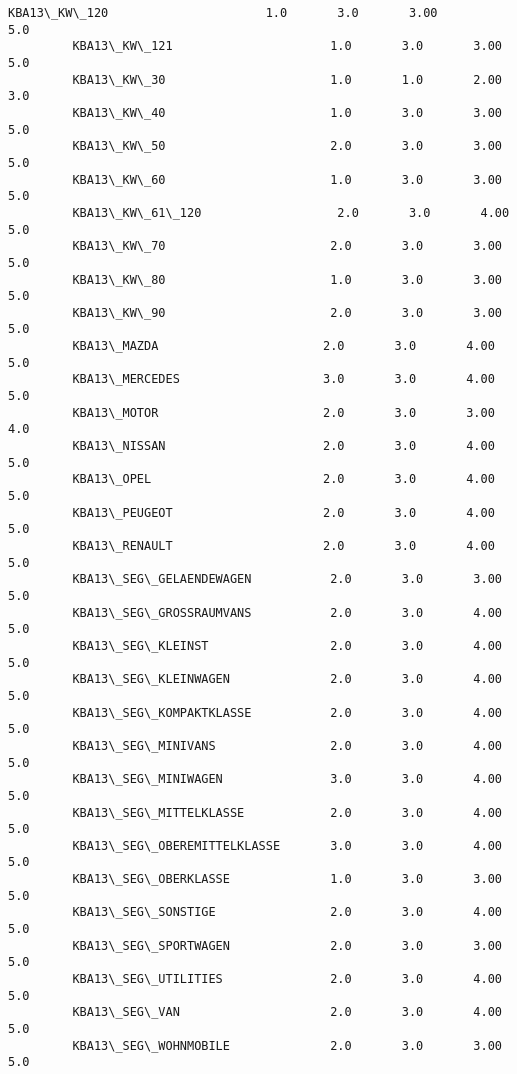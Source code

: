 \documentclass[11pt]{article}
\begin{document}
\begin{Verbatim}[commandchars=\\\{\}]
         KBA13\_KW\_120                      1.0       3.0       3.00        5.0  
         KBA13\_KW\_121                      1.0       3.0       3.00        5.0  
         KBA13\_KW\_30                       1.0       1.0       2.00        3.0  
         KBA13\_KW\_40                       1.0       3.0       3.00        5.0  
         KBA13\_KW\_50                       2.0       3.0       3.00        5.0  
         KBA13\_KW\_60                       1.0       3.0       3.00        5.0  
         KBA13\_KW\_61\_120                   2.0       3.0       4.00        5.0  
         KBA13\_KW\_70                       2.0       3.0       3.00        5.0  
         KBA13\_KW\_80                       1.0       3.0       3.00        5.0  
         KBA13\_KW\_90                       2.0       3.0       3.00        5.0  
         KBA13\_MAZDA                       2.0       3.0       4.00        5.0  
         KBA13\_MERCEDES                    3.0       3.0       4.00        5.0  
         KBA13\_MOTOR                       2.0       3.0       3.00        4.0  
         KBA13\_NISSAN                      2.0       3.0       4.00        5.0  
         KBA13\_OPEL                        2.0       3.0       4.00        5.0  
         KBA13\_PEUGEOT                     2.0       3.0       4.00        5.0  
         KBA13\_RENAULT                     2.0       3.0       4.00        5.0  
         KBA13\_SEG\_GELAENDEWAGEN           2.0       3.0       3.00        5.0  
         KBA13\_SEG\_GROSSRAUMVANS           2.0       3.0       4.00        5.0  
         KBA13\_SEG\_KLEINST                 2.0       3.0       4.00        5.0  
         KBA13\_SEG\_KLEINWAGEN              2.0       3.0       4.00        5.0  
         KBA13\_SEG\_KOMPAKTKLASSE           2.0       3.0       4.00        5.0  
         KBA13\_SEG\_MINIVANS                2.0       3.0       4.00        5.0  
         KBA13\_SEG\_MINIWAGEN               3.0       3.0       4.00        5.0  
         KBA13\_SEG\_MITTELKLASSE            2.0       3.0       4.00        5.0  
         KBA13\_SEG\_OBEREMITTELKLASSE       3.0       3.0       4.00        5.0  
         KBA13\_SEG\_OBERKLASSE              1.0       3.0       3.00        5.0  
         KBA13\_SEG\_SONSTIGE                2.0       3.0       4.00        5.0  
         KBA13\_SEG\_SPORTWAGEN              2.0       3.0       3.00        5.0  
         KBA13\_SEG\_UTILITIES               2.0       3.0       4.00        5.0  
         KBA13\_SEG\_VAN                     2.0       3.0       4.00        5.0  
         KBA13\_SEG\_WOHNMOBILE              2.0       3.0       3.00        5.0  

\end{Verbatim}
\end{document}
